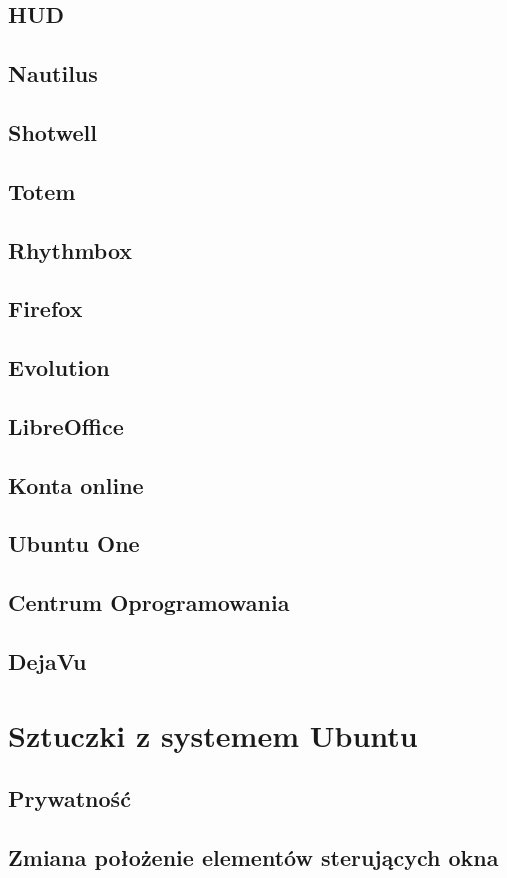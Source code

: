 \documentclass[a4paper,11pt,oneside]{mwart}
\begin{document}
	\subsection{HUD}
	\subsection{Nautilus}
	\subsection{Shotwell}
	\subsection{Totem}
	\subsection{Rhythmbox}
	\subsection{Firefox}
	\subsection{Evolution}
	\subsection{LibreOffice}
	\subsection{Konta online}
	\subsection{Ubuntu One}
	\subsection{Centrum Oprogramowania}
	\subsection{DejaVu}
\section{Sztuczki z systemem Ubuntu}
	\subsection{Prywatność}
	\subsection{Zmiana położenie elementów sterujących okna}
\end{document}
